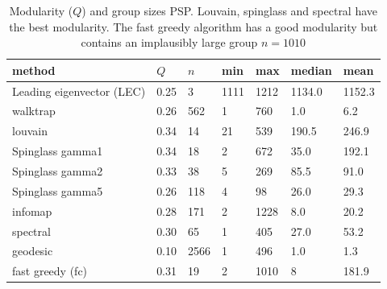   

\begin{table}[ht]
\centering
\setlength{\extrarowheight}{2pt}
\begin{tabular}{lllllll}
  \toprule
method & $Q$ & $n$ & min & max & median & mean \\ 
  \midrule
Leading eigenvector (LEC) & 0.25 & 3 & 1111 & 1212 & 1134.0 & 1152.3 \\ 
  walktrap & 0.26 & 562 & 1 & 760 & 1.0 & 6.2 \\ 
  louvain & 0.34 & 14 & 21 & 539 & 190.5 & 246.9 \\ 
  Spinglass gamma1 & 0.34 & 18 & 2 & 672 & 35.0 & 192.1 \\ 
  Spinglass gamma2 & 0.33 & 38 & 5 & 269 & 85.5 & 91.0 \\ 
  Spinglass gamma5 & 0.26 & 118 & 4 & 98 & 26.0 & 29.3 \\ 
  infomap & 0.28 & 171 & 2 & 1228 & 8.0 & 20.2 \\ 
  spectral & 0.30 & 65 & 1 & 405 & 27.0 & 53.2 \\ 
  geodesic & 0.10 & 2566 & 1 & 496 & 1.0 & 1.3 \\ 
  fast greedy (fc) & 0.31 & 19 & 2 & 1010 & 8 & 181.9 \\
   \bottomrule
\end{tabular}
\caption[Modularity and group size for different clustering modalities PSP]{Modularity ($Q$) and group sizes PSP. Louvain, spinglass and spectral have the best modularity. The fast greedy algorithm has a good modularity but contains an implausibly large group $n=1010$} 
\label{tab:modularity and group sizes xtable}
\end{table}

